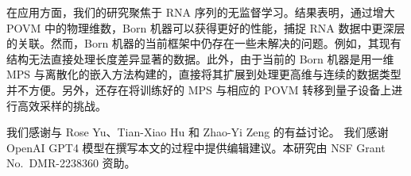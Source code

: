 \documentclass[aps,prb,twocolumn,superscriptaddress]{revtex4-2}
\begin{document}
在应用方面，我们的研究聚焦于 RNA 序列的无监督学习。结果表明，通过增大 POVM 中的物理维数，Born 机器可以获得更好的性能，捕捉 RNA 数据中更深层的关联。然而，Born 机器的当前框架中仍存在一些未解决的问题。例如，其现有结构无法直接处理长度差异显著的数据。此外，由于当前的 Born 机器是用一维 MPS 与离散化的嵌入方法构建的，直接将其扩展到处理更高维与连续的数据类型并不方便。另外，还存在将训练好的 MPS 与相应的 POVM 转移到量子设备上进行高效采样的挑战。

\begin{acknowledgments}
我们感谢与 Rose Yu、Tian-Xiao Hu 和 Zhao-Yi Zeng 的有益讨论。
我们感谢 OpenAI GPT4 模型在撰写本文的过程中提供编辑建议。本研究由 NSF Grant No.~DMR-2238360 资助。
\end{acknowledgments}
















\onecolumngrid
\newpage
\appendix
\setcounter{secnumdepth}{2}
\end{document}
